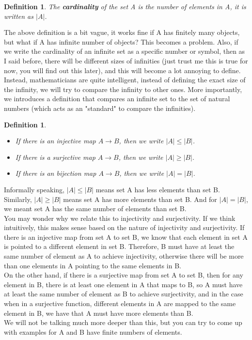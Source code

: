 \documentclass{book}
\newtheorem{definition}[theorem]{Definition}
\begin{document}
\begin{definition}
    The \textbf{cardinality} of the set A is the number of elements in A, it is written as $|A|$.
\end{definition}

The above definition is a bit vague, it works fine if A has finitely many objects, but what if A has infinite number of objects? This becomes a problem. Also, if we write the cardinality of an infinite set as a specific number or symbol, then as I said before, there will be different sizes of infinities (just trust me this is true for now, you will find out this later), and this will become a lot annoying to define. Instead, mathematicians are quite intelligent, instead of defining the exact size of the infinity, we will try to compare the infinity to other ones. More importantly, we introduces a definition that compares an infinite set to the set of natural numbers (which acts as an "standard" to compare the infinities).

\begin{definition}
    \begin{itemize}[itemsep = 0pt]
        \item[(1)] If there is an injective map $A \rightarrow B$, then we write $|A| \leq |B|$.
        \item[(2)] If there is a surjective map $A \rightarrow B$, then we write $|A| \geq |B|$.
        \item[(3)] If there is an bijection map $A \rightarrow B$, then we write $|A| = |B|$.
    \end{itemize}
\end{definition}

Informally speaking, $|A| \leq |B|$ means set A has less elements than set B. Similarly, $|A| \geq |B|$ means set A has more elements than set B. And for $|A| = |B|$, we meant set A has the same number of elements than set B. \\
\indent You may wonder why we relate this to injectivity and surjectivity. If we think intuitively, this makes sense based on the nature of injectivity and surjectivity. If there is an injective map from set A to set B, we know that each element in set A is pointed to a different element in set B. Therefore, B must have at least the same number of element as A to achieve injectivity, otherwise there will be more than one elements in A pointing to the same elements in B. \\
\indent On the other hand, if there is a surjective map from set A to set B, then for any element in B, there is at least one element in A that maps to B, so A must have at least the same number of element as B to achieve surjectivity, and in the case when in a surjective function, different elements in A are mapped to the same element in B, we have that A must have more elements than B. \\
\indent We will not be talking much more deeper than this, but you can try to come up with examples for A and B have finite numbers of elements.
\end{document}
